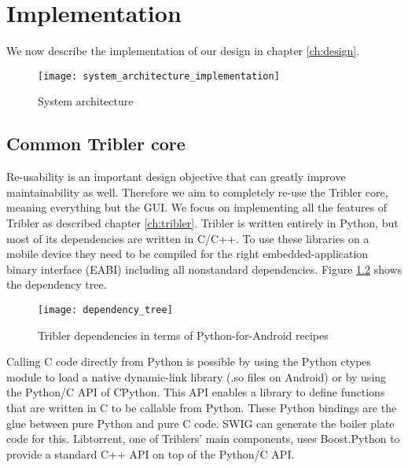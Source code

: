 \chapter{Implementation}
\label{ch:implementation}

We now describe the implementation of our design in chapter \ref{ch:design}.

\begin{figure}[H]
	\centering
	\texttt{[image: system\_architecture\_implementation]}
	\caption{System architecture}
	\label{fig:system_architecture_implementation}
\end{figure}

\section{Common Tribler core}
Re-usability is an important design objective that can greatly improve maintainability as well.
Therefore we aim to completely re-use the Tribler core, meaning everything but the GUI.
We focus on implementing all the features of Tribler as described chapter \ref{ch:tribler}.
Tribler is written entirely in Python, but most of its dependencies are written in C/C++.
To use these libraries on a mobile device they need to be compiled for the right embedded-application binary interface (EABI) including all nonstandard dependencies.
Figure \ref{fig:dependency_tree} shows the dependency tree.

\begin{figure}[H]
	\centering
	\texttt{[image: dependency\_tree]}
	\caption{Tribler dependencies in terms of Python-for-Android recipes}
	\label{fig:dependency_tree}
\end{figure}

Calling C code directly from Python is possible by using the Python ctypes module to load a native dynamic-link library (.so files on Android) or by using the Python/C API of CPython.
This API enables a library to define functions that are written in C to be callable from Python.
These Python bindings are the glue between pure Python and pure C code.
SWIG can generate the boiler plate code for this.
Libtorrent, one of Triblers' main components, uses Boost.Python to provide a standard C++ API on top of the Python/C API.

